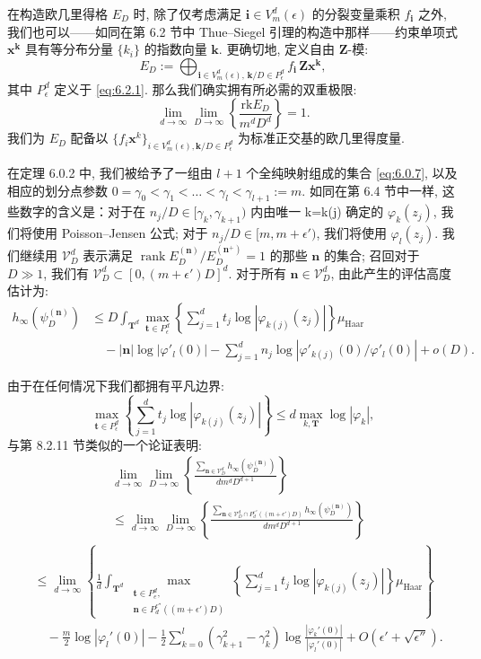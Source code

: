 在构造欧几里得格 \(E_D\) 时, 除了仅考虑满足 \(\mathbf{i} \in V_m^d(\epsilon)\) 的分裂变量乘积 \(f_{\mathbf{i}}\) 之外, 
我们也可以——如同在第 6.2 节中 Thue--Siegel 引理的构造中那样——约束单项式 \(\mathbf{x}^{\mathbf{k}}\) 具有等分布分量 \(\{k_i\}\) 的指数向量 \(\mathbf{k}\). 
更确切地, 定义自由 \(\mathbf{Z}\)-模:
\[ E_D := \bigoplus_{\mathbf{i} \in V_m^d(\epsilon), \, \mathbf{k}/D \in P_\epsilon^d} f_\mathbf{i} \, \mathbf{Z} \mathbf{x}^\mathbf{k}, \]
其中 \(P_{\epsilon}^{d}\) 定义于 \eqref{eq:6.2.1}. 
那么我们确实拥有所必需的双重极限:
\[ \lim_{d \to \infty} \lim_{D \to \infty} \left\{ \frac{\mathrm{rk} E_D}{m^d D^d} \right\} = 1. \]
我们为 \(E_D\) 配备以 \(\{f_i\mathbf{x}^k\}_{i\in V_m^d(\epsilon),\mathbf{k}/D\in P_\epsilon^d}\) 
为标准正交基的欧几里得度量.

在定理 6.0.2 中, 我们被给予了一组由 \(l+1\) 个全纯映射组成的集合 \eqref{eq:6.0.7}, 
以及相应的划分点参数 \(0=\gamma_0<\gamma_1<\ldots<\gamma_l<\gamma_{l+1}:=m\). 
如同在第 6.4 节中一样, 这些数字的含义是：对于在 \(n_j/D\in [\gamma_k,\gamma_{k+1})\) 
内由唯一 k=k(j) 确定的 \(\varphi_k(z_j)\), 我们将使用 Poisson--Jensen 公式; 
对于 \(n_j/D\in [m,m+\epsilon')\), 我们将使用 \(\varphi_l(z_j)\). 
我们继续用 \(\mathcal{V}_D^d\) 表示满足 \(\operatorname{rank} E_D^{(\mathbf{n})}/E_D^{(\mathbf{n}^+)}=1\) 的那些 \(\mathbf{n}\) 的集合; 
召回对于 \(D\gg 1\), 我们有 \(\mathcal{V}_D^d\subset [0,(m+\epsilon')D]^d\). 
对于所有 \(\mathbf{n}\in\mathcal{V}_D^d\), 由此产生的评估高度估计为:
\[
\begin{aligned}
h_{\infty}(\psi_D^{(\mathbf{n})}) 
&\le D \int_{\mathbf{T}^d} \max_{\mathbf{t} \in P_{\epsilon}^d} \left\{ \sum_{j=1}^d t_j \log |\varphi_{k(j)}(z_j)| \right\} \mu_{\text{Haar}} \\
&\quad - |\mathbf{n}| \log |\varphi'_l(0)| - \sum_{j=1}^d n_j \log |\varphi'_{k(j)}(0)/\varphi'_l(0)| + o(D).
\end{aligned}
\]

由于在任何情况下我们都拥有平凡边界:
\[ \max_{\mathbf{t}\in P_{\epsilon}^{d}} \left\{ \sum_{j=1}^{d} t_{j} \log |\varphi_{k(j)}(z_{j})| \right\} \leq d \max_{k,\mathbf{T}} \log |\varphi_{k}|, \]
与第 8.2.11 节类似的一个论证表明:
\[
\begin{aligned}
&\lim_{d \to \infty} \lim_{D \to \infty} \left\{ \frac{\sum_{\mathbf{n} \in \mathcal{V}_D^d} h_{\infty}(\psi_D^{(\mathbf{n})})}{dm^d D^{d+1}} \right\} \\
&\leq \lim_{d \to \infty} \lim_{D \to \infty} \left\{ \frac{\sum_{\mathbf{n} \in \mathcal{V}_D^d \cap P_d^{\epsilon''}((m+\epsilon')D)} h_{\infty}(\psi_D^{(\mathbf{n})})}{dm^d D^{d+1}} \right\}
\end{aligned}
\]
\[
\begin{aligned}
&\leq \lim_{d \to \infty} \left\{ \frac{1}{d} \int_{\mathbf{T}^d} \max_{\substack{\mathbf{t} \in P_e^d, \\ \mathbf{n} \in P_d^{\epsilon''}((m+\epsilon')D)}} \left\{ \sum_{j=1}^d t_j \log |\varphi_{k(j)}(z_j)| \right\} \mu_{\text{Haar}} \right\} \\
&\quad - \frac{m}{2} \log |\varphi_l'(0)| - \frac{1}{2} \sum_{k=0}^l (\gamma_{k+1}^2 - \gamma_k^2) \log \frac{|\varphi_k'(0)|}{|\varphi_l'(0)|} + O(\epsilon' + \sqrt{\epsilon''}).
\end{aligned}
\]

